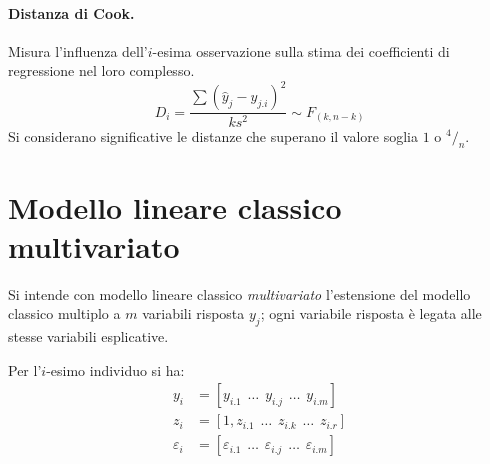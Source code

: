 \documentclass[a4page, 11pt]{article} %
\begin{document}
\paragraph{Distanza di Cook.} Misura l’influenza dell'$i$-esima osservazione sulla stima dei coefficienti di regressione nel loro complesso.
\begin{equation*}
D_i = \frac{\sum(\hat{y}_j - \hat{y}_{j.i})^2}{k s^2} \sim F_{(k, n-k)}
\end{equation*}
Si considerano significative le distanze che superano il valore soglia $1$ o $^4/_n$.


\section{Modello lineare classico multivariato}
Si intende con modello lineare classico \textit{multivariato} l'estensione del modello classico multiplo a $m$ variabili risposta $y_j$; ogni variabile risposta è legata alle stesse variabili esplicative.

Per l'$i$-esimo individuo si ha:
\begin{align*}
y_i &= [y_{i.1} \hspace{5pt} \dots \hspace{5pt} y_{i.j} \hspace{5pt} \dots \hspace{5pt} y_{i.m}]\\
z_i &= [1, z_{i.1} \hspace{5pt} \dots \hspace{5pt} z_{i.k} \hspace{5pt} \dots \hspace{5pt} z_{i.r}]\\
\varepsilon_i &= [\varepsilon_{i.1} \hspace{5pt} \dots \hspace{5pt} \varepsilon_{i.j} \hspace{5pt} \dots \hspace{5pt} \varepsilon_{i.m}]
\end{align*}
\end{document}
